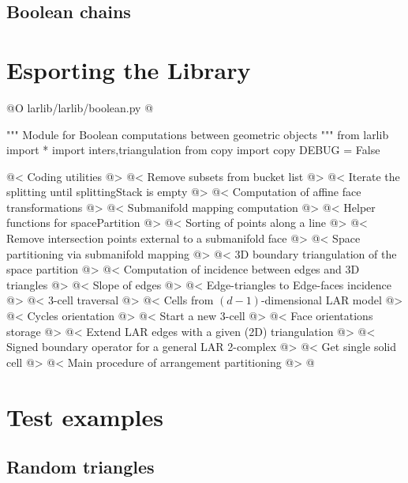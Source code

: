 \documentclass[11pt,oneside]{article}    %
\begin{document}
\subsection{Boolean chains}

\section{Esporting the Library}

@O larlib/larlib/boolean.py
@{""" Module for Boolean computations between geometric objects """
from larlib import *
import inters,triangulation
from copy import copy
DEBUG = False

@< Coding utilities @>
@< Remove subsets from bucket list @>
@< Iterate the splitting until splittingStack is empty @>
@< Computation of affine face transformations @>
@< Submanifold mapping computation @>
@< Helper functions for spacePartition @>
@< Sorting of points along a line @>
@< Remove intersection points external to a submanifold face @>
@< Space partitioning via submanifold mapping @>
@< 3D boundary triangulation of the space partition @>
@< Computation of incidence between edges and 3D triangles @>
@< Slope of edges @>
@< Edge-triangles to Edge-faces incidence @>
@< 3-cell traversal @>
@< Cells from $(d-1)$-dimensional LAR model @>
@< Cycles orientation @>
@< Start a new 3-cell @>
@< Face orientations storage @>
@< Extend LAR edges with a given (2D) triangulation @>
@< Signed boundary operator for a general LAR 2-complex @>
@< Get single solid cell @>
@< Main procedure of arrangement partitioning @>
@}
    
\section{Test examples}

\subsection{Random triangles}
\end{document}
